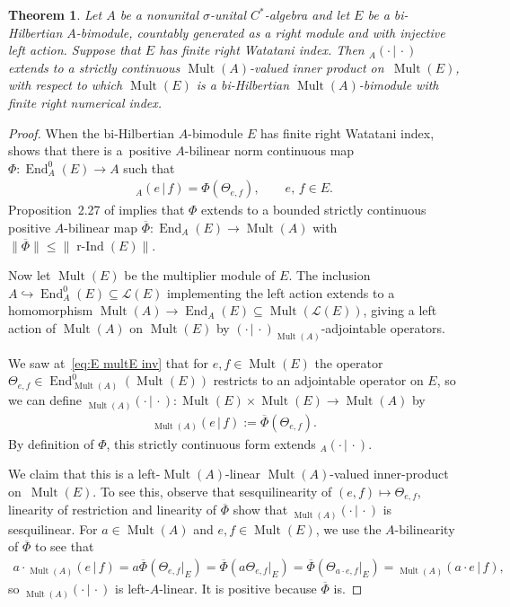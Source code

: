\documentclass[10pt,a4paper]{amsart}
\numberwithin{equation}{section}
\newtheorem{thm}{Theorem}[section]
\DeclareMathOperator{\End}{End} %
\DeclareMathOperator{\Mult}{Mult} %
\newcommand{\rInd}{\operatorname{\mbox{$r$-$\operatorname{Ind}$}}}
\renewcommand{\L}{\mathcal{L}}
\newcommand{\ol}[1]{\overline{#1}} %
\begin{document}
\begin{thm}\label{thm:main} Let $A$ be a nonunital $\sigma$-unital $C^*$-algebra and let $E$ be a bi-Hilbertian $A$-bimodule, countably generated as a right module and with injective left action. Suppose that $E$ has finite right Watatani index. Then ${_A(\cdot \,|\, \cdot)}$ extends to a strictly continuous $\Mult(A)$-valued inner product on~$\Mult(E)$, with respect to which $\Mult(E)$ is a bi-Hilbertian $\Mult(A)$-bimodule with finite right numerical index.
\end{thm}
\begin{proof}
When the bi-Hilbertian $A$-bimodule $E$ has f\/inite right Watatani index, \cite[Corollary~2.11]{KajPinWat} shows that there is a~positive $A$-bilinear norm continuous map $\Phi\colon \End_A^0(E)\to A$ such that
\begin{gather*}
{}_A(e\,|\, f)=\Phi(\Theta_{e,f}),\qquad e,\,f\in E.
\end{gather*}
Proposition~2.27 of \cite{KajPinWat} implies that $\Phi$ extends to a bounded strictly continuous positive $A$-bilinear map $\overline{\Phi} \colon \End_{A}(E)\to \Mult(A)$ with $\|\ol{\Phi}\| \le \|\rInd(E)\|$.

Now let $\Mult(E)$ be the multiplier module of $E$. The inclusion $A \hookrightarrow \End^0_A(E) \subseteq \L(E)$ implementing the left action extends to a homomorphism $\Mult(A) \to \End_A(E) \subseteq \Mult(\L(E))$, giving a left action of $\Mult(A)$ on $\Mult(E)$ by $(\cdot \,|\, \cdot)_{\Mult(A)}$-adjointable operators.

We saw at~\eqref{eq:E multE inv} that for $e,f \in \Mult(E)$ the operator $\Theta_{e,f} \in \End^0_{\Mult(A)}(\Mult(E))$ restricts to an adjointable operator on $E$, so we can def\/ine ${_{\Mult(A)}(\cdot \,|\, \cdot)} \colon \Mult(E) \times \Mult(E) \to \Mult(A)$ by
\begin{gather*}
{}_{\Mult(A)}(e\,|\, f):=\ol{\Phi}(\Theta_{e,f}).
\end{gather*}
By def\/inition of $\Phi$, this strictly continuous form extends ${_A(\cdot \,|\, \cdot)}$.

We claim that this is a left-$\Mult(A)$-linear $\Mult(A)$-valued inner-product on~$\Mult(E)$. To see this, observe that sesquilinearity of $(e,f) \mapsto \Theta_{e,f}$, linearity of restriction and linearity of $\overline{\Phi}$ show that ${_{\Mult(A)}(\cdot \,|\, \cdot)}$ is sesquilinear. For $a \in \Mult(A)$ and $e,f \in \Mult(E)$, we use the $A$-bilinearity of $\overline{\Phi}$ to see that
\begin{gather*}
a \cdot {_{\Mult(A)}(e \,|\, f)} = a \overline{\Phi}(\Theta_{e,f}|_E) = \overline{\Phi}(a \Theta_{e,f}|_E) = \overline{\Phi}(\Theta_{a \cdot e, f}|_E) = {_{\Mult(A)}(a \cdot e \,|\, f)},
\end{gather*}
so ${_{\Mult(A)}(\cdot \,|\, \cdot)}$ is left-$A$-linear. It is positive because
$\overline{\Phi}$ is.


\end{proof}
\end{document}
